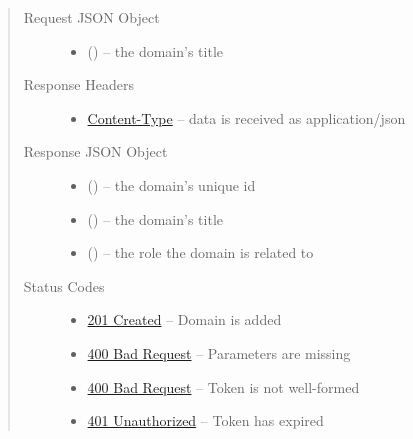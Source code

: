\documentclass[letterpaper,10pt,english]{sphinxmanual}
\begin{document}
\begin{fulllineitems}
\begin{quote}
\begin{description}
\begin{itemize}
\end{itemize}

\item[{Request JSON Object}] \leavevmode\begin{itemize}
\item {} 
 () -- the domain's title

\end{itemize}

\item[{Response Headers}] \leavevmode\begin{itemize}
\item {} 
\href{http://tools.ietf.org/html/rfc7231\#section-3.1.1.5}{Content-Type} -- data is received as application/json

\end{itemize}

\item[{Response JSON Object}] \leavevmode\begin{itemize}
\item {} 
 () -- the domain's unique id

\item {} 
 () -- the domain's title

\item {} 
 () -- the role the domain is related to

\end{itemize}

\item[{Status Codes}] \leavevmode\begin{itemize}
\item {} 
\href{http://www.w3.org/Protocols/rfc2616/rfc2616-sec10.html\#sec10.2.2}{201 Created} -- Domain is added

\item {} 
\href{http://www.w3.org/Protocols/rfc2616/rfc2616-sec10.html\#sec10.4.1}{400 Bad Request} -- Parameters are missing

\item {} 
\href{http://www.w3.org/Protocols/rfc2616/rfc2616-sec10.html\#sec10.4.1}{400 Bad Request} -- Token is not well-formed

\item {} 
\href{http://www.w3.org/Protocols/rfc2616/rfc2616-sec10.html\#sec10.4.2}{401 Unauthorized} -- Token has expired


\end{itemize}
\end{description}
\end{quote}
\end{fulllineitems}
\end{document}
